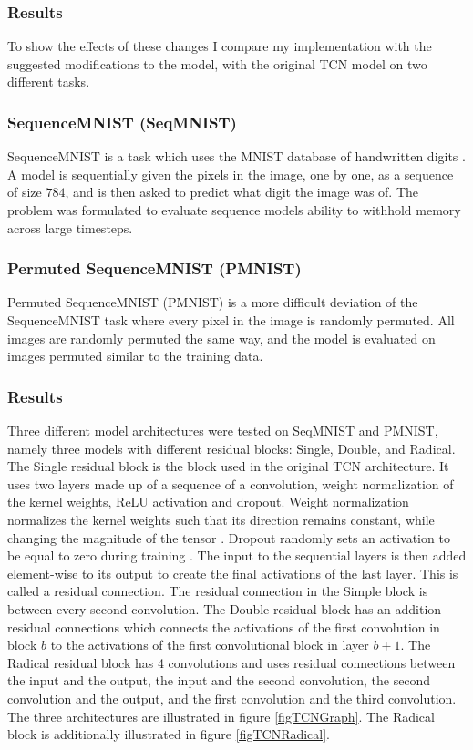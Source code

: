 \documentclass[a4paper, twoside]{article}
\begin{document}
\subsubsection{Results}
To show the effects of these changes I compare my implementation with the suggested modifications to the model, with the original TCN model \cite{tcn} on two different tasks.

\subsubsection{SequenceMNIST (SeqMNIST)}
SequenceMNIST is a task which uses the MNIST database of handwritten digits \cite{MNIST}. A model is sequentially given the pixels in the image, one by one, as a sequence of size $784$, and is then asked to predict what digit the image was of. The problem was formulated to evaluate sequence models ability to withhold memory across large timesteps.

\subsubsection{Permuted SequenceMNIST (PMNIST)}
Permuted SequenceMNIST (PMNIST) is a more difficult deviation of the SequenceMNIST task where every pixel in the image is randomly permuted. All images are randomly permuted the same way, and the model is evaluated on images permuted similar to the training data.

\subsubsection{Results}
Three different model architectures were tested on SeqMNIST and PMNIST, namely three models with different residual blocks: Single, Double, and Radical. The Single residual block is the block used in the original TCN \cite{tcn} architecture. It uses two layers made up of a sequence of a convolution, weight normalization of the kernel weights, ReLU activation and dropout. Weight normalization normalizes the kernel weights such that its direction remains constant, while changing the magnitude of the tensor \cite{pytorch}. Dropout randomly sets an activation to be equal to zero during training \cite{cs231n}. The input to the sequential layers is then added element-wise to its output to create the final activations of the last layer. This is called a residual connection. The residual connection in the Simple block is between every second convolution. The Double residual block has an addition residual connections which connects the activations of the first convolution in block $b$ to the activations of the first convolutional block in layer $b+1$. The Radical residual block has 4 convolutions and uses residual connections between the input and the output, the input and the second convolution, the second convolution and the output, and the first convolution and the third convolution. The three architectures are illustrated in figure \ref{figTCNGraph}. The Radical block is additionally illustrated in figure \ref{figTCNRadical}.
\end{document}
